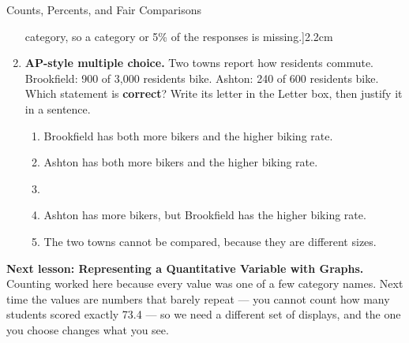 \documentclass[12pt]{article}
\newcommand{\answerspace}[2]{\par\nopagebreak\noindent\begin{minipage}[t][#1][t]{\linewidth}%
  \color{keyred}\bfseries #2\end{minipage}\par}
\begin{document}
\begin{notesbox}{Counts, Percents, and Fair Comparisons}
\begin{enumerate}[leftmargin=1.9em, itemsep=6pt]
{{        category, so a category or 5\% of the responses is missing.}]{\linewidth}{2.2cm}}
  \tcbbreak
  \item \textbf{AP-style multiple choice.} Two towns report how residents commute. Brookfield: 900 of
        3{,}000 residents bike. Ashton: 240 of 600 residents bike. Which statement is
        \textbf{correct}? Write its letter in the Letter box, then justify it in a sentence.
        \begin{enumerate}[label=\textbf{(\Alph*)}, leftmargin=2.2em, itemsep=2pt]
          \item Brookfield has both more bikers and the higher biking rate.
          \item Ashton has both more bikers and the higher biking rate.
          \item {}
          \item Ashton has more bikers, but Brookfield has the higher biking rate.
          \item The two towns cannot be compared, because they are different sizes.
                \hfill{}
        \end{enumerate}
        \answerspace{2.15in}{\normalcolor\mdseries\gradedblank[id=hw5j, type=rubric, points=1,
          display={(C). Brookfield: $900/3000 = 30\%$; Ashton: $240/600 = 40\%$.}]{\linewidth}{2.2cm}}
\end{enumerate}
\end{notesbox}

\vspace{0.12in}

\boxguard[10]
\begin{spiralbox}
\small
\textbf{Next lesson: Representing a Quantitative Variable with Graphs.} Counting worked here
because every value was one of a few category names. Next time the values are numbers that
barely repeat --- you cannot count how many students scored exactly 73.4 --- so we need a
different set of displays, and the one you choose changes what you see.
\end{spiralbox}
\end{document}
